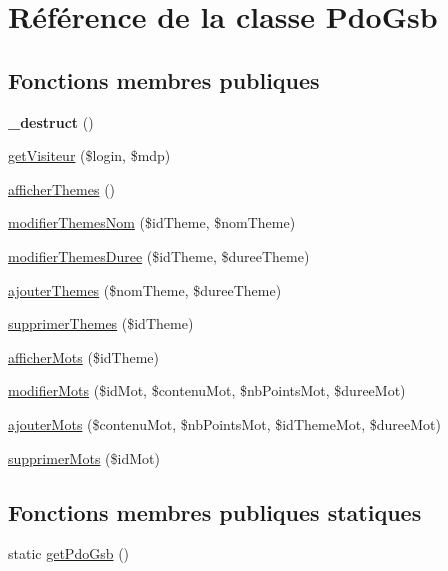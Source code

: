\hypertarget{class_pdo_gsb}{\section{Référence de la classe Pdo\-Gsb}
\label{class_pdo_gsb}
}
\subsection*{Fonctions membres publiques}
\begin{DoxyCompactItemize}
\item 
\hypertarget{class_pdo_gsb_a1c6024f681d3956654622d9f28e540a2}{{\bfseries \-\_\-destruct} ()}\label{class_pdo_gsb_a1c6024f681d3956654622d9f28e540a2}

\item 
\hyperlink{class_pdo_gsb_a12cc955e88fe6ab739a2498420d82c88}{get\-Visiteur} (\$login, \$mdp)
\item 
\hyperlink{class_pdo_gsb_a69eca6fd14dc3603c969985aa148485e}{afficher\-Themes} ()
\item 
\hyperlink{class_pdo_gsb_a5c1a0c71bb9fd7cfa18b15104f4a5b9d}{modifier\-Themes\-Nom} (\$id\-Theme, \$nom\-Theme)
\item 
\hyperlink{class_pdo_gsb_ad29986ea3a95e18a13609712ea01753d}{modifier\-Themes\-Duree} (\$id\-Theme, \$duree\-Theme)
\item 
\hyperlink{class_pdo_gsb_a139b324f49a25586db41b00ef0666d6e}{ajouter\-Themes} (\$nom\-Theme, \$duree\-Theme)
\item 
\hyperlink{class_pdo_gsb_ab3ed6fa43b2858cc13d6f842164e9f37}{supprimer\-Themes} (\$id\-Theme)
\item 
\hyperlink{class_pdo_gsb_a5880ee729b1fd37abb54c3b1c971df7c}{afficher\-Mots} (\$id\-Theme)
\item 
\hyperlink{class_pdo_gsb_a35d174f171da6b722e68ff84e135d1d5}{modifier\-Mots} (\$id\-Mot, \$contenu\-Mot, \$nb\-Points\-Mot, \$duree\-Mot)
\item 
\hyperlink{class_pdo_gsb_a553107c9010c29bb8e015aadb6f093ef}{ajouter\-Mots} (\$contenu\-Mot, \$nb\-Points\-Mot, \$id\-Theme\-Mot, \$duree\-Mot)
\item 
\hyperlink{class_pdo_gsb_ac10f114c36c8ae0f328ad6ff6168d437}{supprimer\-Mots} (\$id\-Mot)
\end{DoxyCompactItemize}
\subsection*{Fonctions membres publiques statiques}
\begin{DoxyCompactItemize}
\item 
static \hyperlink{class_pdo_gsb_a37ab3ed998137aeaf4d581365520067e}{get\-Pdo\-Gsb} ()
\end{DoxyCompactItemize}


